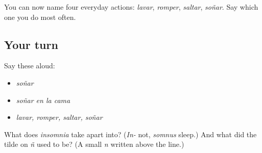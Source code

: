 \begin{grammarlens}[title={What you've built}]
You can now name four everyday actions: \emph{lavar}, \emph{romper}, \emph{saltar}, \emph{soñar}. Say which one you do most often.
\end{grammarlens}

\subsection*{Your turn}
Say these aloud:

\begin{itemize}
\raggedright
  \item \emph{soñar}
  \item \emph{soñar en la cama}
  \item \emph{lavar, romper, saltar, soñar}
\end{itemize}

\begin{tcolorbox}[breakable,colback=teal!4,colframe=teal!35!black,title={Before you move on}]
What does \emph{insomnia} take apart into? (\emph{In-} not, \emph{somnus} sleep.) And what did the tilde on \emph{ñ} used to be? (A small \emph{n} written above the line.)
\end{tcolorbox}
